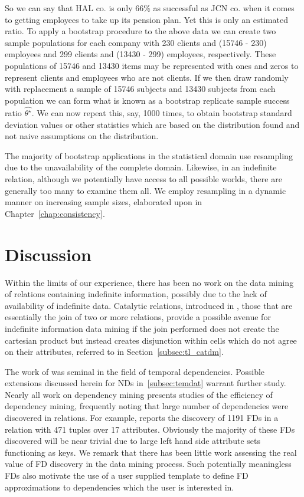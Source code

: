So we can say that HAL co. is only 66\% as successful as JCN co. when
 it comes to getting employees to take up its pension plan. Yet
this is only an estimated ratio. To apply a bootstrap procedure to
the above data we can create two sample populations for each
company with 230 clients and
(15746 - 230) employees and 299 clients and (13430 - 299) employees,
 respectively. These populations of 15746 and 13430 items may be
 represented with ones and zeros to represent clients and
 employees who are not clients.
If we then draw randomly with replacement a sample of 15746 subjects and 13430
 subjects from each population
we can form what is known as a bootstrap replicate sample success ratio
$\hat{\theta^\star}$. We can now repeat this, say, 1000 times, to
obtain bootstrap standard deviation values or other statistics which are based
on the distribution found and not naive assumptions on the distribution.

\smallskip

The majority of bootstrap applications in the statistical domain use
resampling due to the unavailability of the complete domain. Likewise,
in an indefinite relation, although we potentially have access to all
possible worlds, there are generally too many to examine them all. We
employ resampling in a dynamic manner on increasing sample sizes,
elaborated upon in Chapter~\ref{chap:consistency}. 

\section{Discussion}


Within the limits of our experience, there has
been no work on the data mining of relations containing indefinite
information, possibly due to the lack of availability of indefinite data.
Catalytic relations, introduced in \cite{HS95}, those that are
essentially the join of 
two or more relations, provide a possible avenue for indefinite
information data mining if the join performed does not create the
cartesian product but instead creates disjunction within cells which
do not agree on their attributes, referred to in
Section~\ref{subsec:tl_catdm}. 

\medskip

The work of \cite{Via87,Via88} was seminal in the field of temporal
dependencies. Possible extensions discussed herein for NDs
in~\ref{subsec:temdat} warrant
further study. Nearly all work on dependency mining
\cite{Mann92,km95,sf93,bb95,hkp98} presents studies of the efficiency
of dependency mining, frequently noting that large number of
dependencies were discovered in relations. For example, \cite{sf93}
reports the discovery of 1191 FDs in a relation with 471 tuples over
17 attributes. Obviously the majority of these FDs discovered will
be near trivial due to large left hand side attribute sets functioning as
keys. We remark that there has been little work assessing the
real value of FD discovery in the data mining process. Such
potentially meaningless FDs also motivate the use of a user supplied
template to 
define FD approximations to dependencies which the user is interested
in.  

